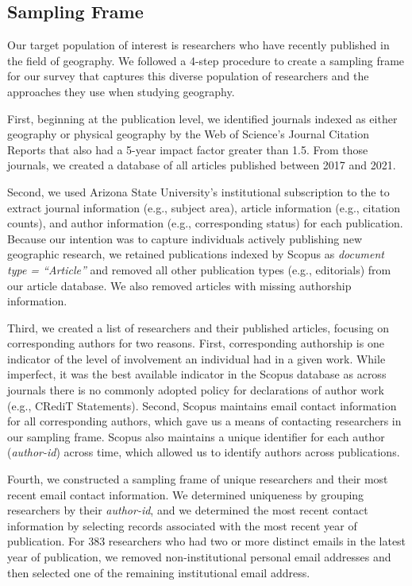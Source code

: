 \documentclass[]{interact}
\theoremstyle{plain}%
\theoremstyle{definition}
\theoremstyle{remark}
\begin{document}
\subsection*{Sampling Frame}
Our target population of interest is researchers who have recently published in the field of geography. 
We followed a 4-step procedure to create a sampling frame for our survey that captures this diverse population of researchers and the approaches they use when studying geography. 

First, beginning at the publication level, we identified journals indexed as either geography or physical geography by the Web of Science's Journal Citation Reports that also had a 5-year impact factor greater than 1.5.
From those journals, we created a database of all articles published between 2017 and 2021.  

Second, we used Arizona State University's institutional subscription to the \citet{Scopus} to extract journal information (e.g., subject area), article information (e.g., citation counts), and author information (e.g., corresponding status) for each publication. 
Because our intention was to capture individuals actively publishing new geographic research, we retained publications indexed by Scopus as \textit{document type = ``Article''} and removed all other publication types (e.g., editorials) from our article database. 
We also removed articles with missing authorship information. 

Third, we created a list of researchers and their published articles, focusing on corresponding authors for two reasons.
First, corresponding authorship is one indicator of the level of involvement an individual had in a given work. 
While imperfect, it was the best available indicator in the Scopus database as across journals there is no commonly adopted policy for declarations of author work (e.g., CRediT Statements).
Second, Scopus maintains email contact information for all corresponding authors, which gave us a means of contacting researchers in our sampling frame.
Scopus also maintains a unique identifier for each author (\textit{author-id}) across time, which allowed us to identify authors across publications. 

Fourth, we constructed a sampling frame of unique researchers and their most recent email contact information. 
We determined uniqueness by grouping researchers by their \textit{author-id}, and we determined the most recent contact information by selecting records associated with the most recent year of publication. 
For 383 researchers who had two or more distinct emails in the latest year of publication, we removed non-institutional personal email addresses and then selected one of the remaining institutional email address.
\end{document}
